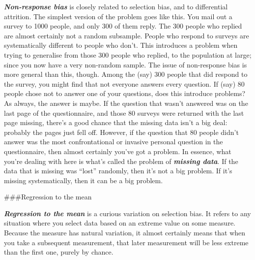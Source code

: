 \documentclass[]{book}
\begin{document}
\textbf{\emph{Non-response bias}} is closely related to selection bias, and to differential attrition. The simplest version of the problem goes like this. You mail out a survey to 1000 people, and only 300 of them reply. The 300 people who replied are almost certainly not a random subsample. People who respond to surveys are systematically different to people who don't. This introduces a problem when trying to generalise from those 300 people who replied, to the population at large; since you now have a very non-random sample. The issue of non-response bias is more general than this, though. Among the (say) 300 people that did respond to the survey, you might find that not everyone answers every question. If (say) 80 people chose not to answer one of your questions, does this introduce problems? As always, the answer is maybe. If the question that wasn't answered was on the last page of the questionnaire, and those 80 surveys were returned with the last page missing, there's a good chance that the missing data isn't a big deal: probably the pages just fell off. However, if the question that 80 people didn't answer was the most confrontational or invasive personal question in the questionnaire, then almost certainly you've got a problem. In essence, what you're dealing with here is what's called the problem of \textbf{\emph{missing data}}. If the data that is missing was ``lost'' randomly, then it's not a big problem. If it's missing systematically, then it can be a big problem.

\#\#\#Regression to the mean

\textbf{\emph{Regression to the mean}} is a curious variation on selection bias. It refers to any situation where you select data based on an extreme value on some measure. Because the measure has natural variation, it almost certainly means that when you take a subsequent measurement, that later measurement will be less extreme than the first one, purely by chance.
\end{document}
